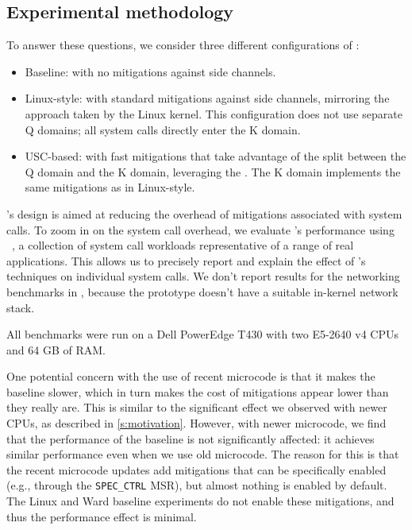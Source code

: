\subsection{Experimental methodology}

To answer these questions, we consider three different configurations of \sys:

\begin{itemize}
\item Baseline: \sys with no mitigations against side channels.

\item Linux-style: \sys with standard mitigations against side channels,
mirroring the approach taken by the Linux kernel.  This configuration does
not use separate Q domains; all system calls directly enter the K domain.

\item USC-based: \sys with fast mitigations that take advantage of the split
between the Q domain and the K domain, leveraging the \contract{}.  The
K domain implements the same mitigations as in Linux-style.

\end{itemize}

\sys's design is aimed at reducing the overhead of mitigations
associated with system calls.  To zoom in on the system call overhead,
we evaluate \sys's performance using \bench~\cite{lebench}, a
collection of system call workloads representative of a range of real
applications.  This allows us to precisely report and explain the
effect of \sys's techniques on individual system calls.  We don't
report results for the networking benchmarks in \bench, because the
\sys prototype doesn't have a suitable in-kernel network stack.

All benchmarks were run on a Dell PowerEdge T430 with two E5-2640 v4
CPUs and 64 GB of RAM.


One potential concern with the use of recent microcode is that it makes
the baseline slower, which in turn makes the cost of mitigations appear
lower than they really are.  This is similar to the significant effect
we observed with newer CPUs, as described in \autoref{s:motivation}.
However, with newer microcode, we find that the performance of the
baseline is not significantly affected: it achieves similar performance
even when we use old microcode.  The reason for this is that the recent
microcode updates add mitigations that can be specifically enabled (e.g.,
through the \texttt{SPEC\_CTRL} MSR), but almost nothing is enabled by
default.  The Linux and Ward baseline experiments do not enable these
mitigations, and thus the performance effect is minimal.

